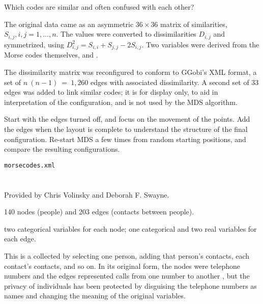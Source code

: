 \bigskip
{} Which codes are similar and often 
confused with each other?

\bigskip
{} 

The original data came as an asymmetric $36\times 36$ matrix of
similarities, $S_{i,j}, i,j=1, ..., n$.  The values were converted to
dissimilarities $D_{i,j}$ and symmetrized, using $D_{i,j} ^ 2 =
S_{i,i} + S_{j,j} - 2S_{i,j}$. Two variables were derived from the
Morse codes themselves,  and .

The dissimilarity matrix was reconfigured to conform to GGobi's XML
format, a set of $n~(n-1) ~=~ 1,260$ edges with associated
dissimilarity.  A second set of 33 edges was added to link similar
codes; it is for display only, to aid in interpretation of the
configuration, and is not used by the MDS algorithm.

\bigskip
{} Start with the edges turned off, and
focus on the movement of the points. Add the edges when the layout is
complete to understand the structure of the final configuration.
Re-start MDS a few times from random starting positions, and compare
the resulting configurations.


\bigskip
{}

\smallskip
{\tt morsecodes.xml}


\section{}

 Provided by Chris Volinsky and Deborah F. Swayne.

\bigskip
{} 140 nodes (people) and 203 edges
(contacts between people).

 two categorical variables for each
  node; one categorical and two real variables for each edge.

\smallskip
{} This is a 
collected by selecting one person, adding that person's contacts, each
contact's contacts, and so on.  In its original form, the nodes were
telephone numbers and the edges represented calls from one number to
another \cite{CPV2003}, but the privacy of individuals has been
protected by disguising the telephone numbers as names and changing
the meaning of the original variables.

